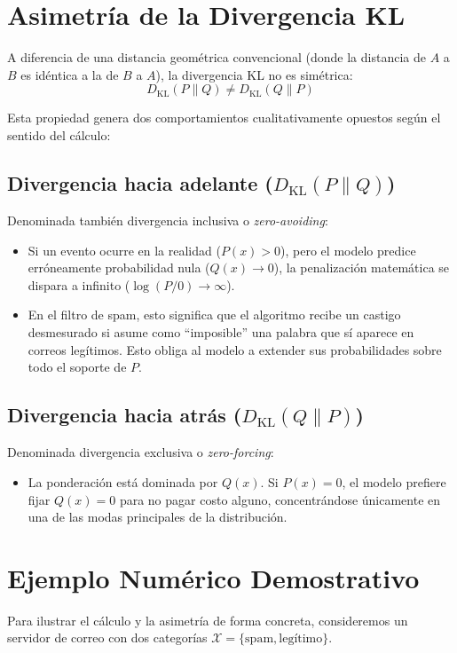 \documentclass[conference]{IEEEtran}
\begin{document}
	\section{Asimetría de la Divergencia KL}
	A diferencia de una distancia geométrica convencional (donde la distancia de $A$ a $B$ es idéntica a la de $B$ a $A$), la divergencia KL no es simétrica:
	\begin{equation}
		D_{\text{KL}}(P \parallel Q) \neq D_{\text{KL}}(Q \parallel P)
	\end{equation}
	
	Esta propiedad genera dos comportamientos cualitativamente opuestos según el sentido del cálculo:
	
	\subsection{Divergencia hacia adelante ($D_{\text{KL}}(P \parallel Q)$)}
	Denominada también divergencia inclusiva o \textit{zero-avoiding}:
	\begin{itemize}
		\item Si un evento ocurre en la realidad ($P(x) > 0$), pero el modelo predice erróneamente probabilidad nula ($Q(x) \to 0$), la penalización matemática se dispara a infinito ($\log(P/0) \to \infty$).
		\item En el filtro de spam, esto significa que el algoritmo recibe un castigo desmesurado si asume como ``imposible'' una palabra que sí aparece en correos legítimos. Esto obliga al modelo a extender sus probabilidades sobre todo el soporte de $P$.
	\end{itemize}
	
	\subsection{Divergencia hacia atrás ($D_{\text{KL}}(Q \parallel P)$)}
	Denominada divergencia exclusiva o \textit{zero-forcing}:
	\begin{itemize}
		\item La ponderación está dominada por $Q(x)$. Si $P(x) = 0$, el modelo prefiere fijar $Q(x) = 0$ para no pagar costo alguno, concentrándose únicamente en una de las modas principales de la distribución.
	\end{itemize}
	
	\section{Ejemplo Numérico Demostrativo}
	Para ilustrar el cálculo y la asimetría de forma concreta, consideremos un servidor de correo con dos categorías $\mathcal{X} = \{\text{spam}, \text{legítimo}\}$.
	
\end{document}
